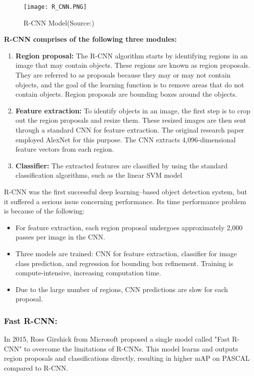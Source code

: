    \begin{figure}[H]
         \centering
         \texttt{[image: R\_CNN.PNG]}
         \caption{R-CNN Model(Source:\cite{girshick2014rich})}
            \label{fig: R-CNN Model}
    \end{figure}
\textbf{R-CNN comprises of the following three modules:}\\
        \begin{enumerate}
            \item \textbf{Region proposal: } The R-CNN algorithm starts by identifying regions in an image that may contain objects. These regions are known as region proposals. They are referred to as proposals because they may or may not contain objects, and the goal of the learning function is to remove areas that do not contain objects. Region proposals are bounding boxes around the objects.
            \item \textbf{Feature extraction:} To identify objects in an image, the first step is to crop out the region proposals and resize them. These resized images are then sent through a standard CNN for feature extraction. The original research paper employed AlexNet for this purpose. The CNN extracts 4,096-dimensional feature vectors from each region.
            \item  \textbf{Classifier: } The extracted features are classified by using the standard classification algorithms, such as the linear SVM model 
        \end{enumerate}
R-CNN was the first successful deep learning–based object detection system, but it suffered a serious issue concerning performance. Its time performance problem is because of the following:
    \begin{itemize}
         \item For feature extraction, each region proposal undergoes approximately 2,000 passes per image in the CNN.
        \item Three models are trained: CNN for feature extraction, classifier for image class prediction, and regression for bounding box refinement. Training is compute-intensive, increasing computation time.
        \item Due to the large number of regions, CNN predictions are slow for each proposal.
    \end{itemize}
        
\subsubsection{Fast R-CNN:} In 2015, Ross Girshick from Microsoft proposed a single model called "Fast R-CNN" to overcome the limitations of R-CNNs. This model learns and outputs region proposals and classifications directly, resulting in higher mAP on PASCAL compared to R-CNN.\cite{girshick2015fast}  

